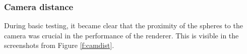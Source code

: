 \subsubsection*{Camera distance}

During basic testing, it became clear that the proximity of the spheres to the camera was crucial in the performance of the renderer.
This is visible in the screenshots from Figure \ref{f:camdist}.

\begin{figure}[!ht]
\centering
{}

\end{figure}
